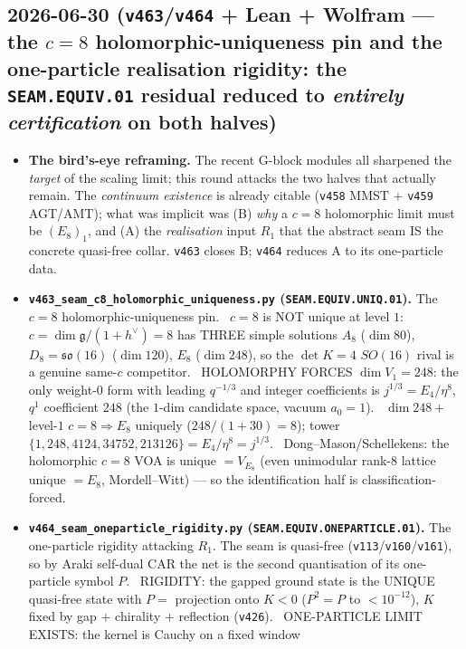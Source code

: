 \subsection*{2026-06-30 (\texttt{v463}/\texttt{v464} + Lean + Wolfram --- the $c{=}8$ holomorphic-uniqueness pin and the one-particle realisation rigidity: the \texttt{SEAM.EQUIV.01} residual reduced to \emph{entirely certification} on both halves)}
\begin{itemize}
\item \textbf{The bird's-eye reframing.} The recent G-block modules all sharpened the \emph{target} of the
scaling limit; this round attacks the two halves that actually remain. The \emph{continuum existence} is already
citable (\texttt{v458} MMST $+$ \texttt{v459} AGT/AMT); what was implicit was (B) \emph{why} a $c{=}8$ holomorphic
limit must be $(E_8)_1$, and (A) the \emph{realisation} input $R_1$ that the abstract seam IS the concrete quasi-free
collar. \texttt{v463} closes B; \texttt{v464} reduces A to its one-particle data.
\item \textbf{\texttt{v463\_seam\_c8\_holomorphic\_uniqueness.py} (\texttt{SEAM.EQUIV.UNIQ.01}).} The $c{=}8$
holomorphic-uniqueness pin. \mE\ $c{=}8$ is NOT unique at level $1$: $c{=}\dim\mathfrak g/(1{+}h^\vee){=}8$ has THREE
simple solutions $A_8$ ($\dim 80$), $D_8{=}\mathfrak{so}(16)$ ($\dim 120$), $E_8$ ($\dim 248$), so the $\det K{=}4$
$SO(16)$ rival is a genuine same-$c$ competitor. \mE\ HOLOMORPHY FORCES $\dim V_1{=}248$: the only weight-$0$ form with
leading $q^{-1/3}$ and integer coefficients is $j^{1/3}{=}E_4/\eta^8$, $q^1$ coefficient $248$ (the $1$-dim candidate
space, vacuum $a_0{=}1$). \mE\ $\dim 248 + $ level-$1$ $c{=}8 \Rightarrow E_8$ uniquely ($248/(1{+}30){=}8$);
tower $\{1,248,4124,34752,213126\}{=}E_4/\eta^8{=}j^{1/3}$. \mC\ Dong--Mason/Schellekens: the holomorphic $c{=}8$ VOA is
unique $={}V_{E_8}$ (even unimodular rank-$8$ lattice unique $={}E_8$, Mordell--Witt) --- so the identification half is
classification-forced.
\item \textbf{\texttt{v464\_seam\_oneparticle\_rigidity.py} (\texttt{SEAM.EQUIV.ONEPARTICLE.01}).} The one-particle
rigidity attacking $R_1$. The seam is quasi-free (\texttt{v113}/\texttt{v160}/\texttt{v161}), so by Araki self-dual
CAR the net is the second quantisation of its one-particle symbol $P$. \mE\ RIGIDITY: the gapped ground state is the
UNIQUE quasi-free state with $P{=}$ projection onto $K{<}0$ ($P^2{=}P$ to $<10^{-12}$), $K$ fixed by gap $+$ chirality
$+$ reflection (\texttt{v426}). \mE\ ONE-PARTICLE LIMIT EXISTS: the kernel is Cauchy on a fixed window

\end{itemize}
